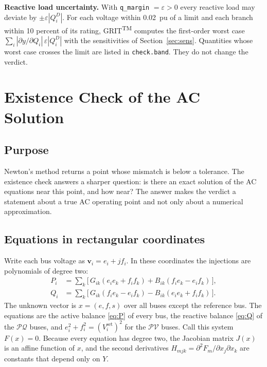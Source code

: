\documentclass[a4paper,11pt]{article}
\newcommand{\TM}{\textsuperscript{TM}}
\newcommand{\GRIT}{GRIT\TM}
\newcommand{\opt}[1]{\texttt{#1}}
\begin{document}
\textbf{Reactive load uncertainty.} With \opt{q\_margin} $=\varepsilon>0$ every reactive load may deviate by $\pm\varepsilon|Q^D_i|$. For each voltage within 0.02~pu of a limit and each branch within 10 percent of its rating, \GRIT{} computes the first-order worst case $\sum_i |\partial y/\partial Q_i|\,\varepsilon|Q^D_i|$ with the sensitivities of Section~\ref{sec:sens}. Quantities whose worst case crosses the limit are listed in \texttt{check.band}. They do not change the verdict.

\section{Existence Check of the AC Solution}\label{sec:cert}

\subsection{Purpose}

Newton's method returns a point whose mismatch is below a tolerance. The existence check answers a sharper question: is there an exact solution of the AC equations near this point, and how near? The answer makes the verdict a statement about a true AC operating point and not only about a numerical approximation.

\subsection{Equations in rectangular coordinates}

Write each bus voltage as $\mathbf{v}_i = e_i + j f_i$. In these coordinates the injections are polynomials of degree two:
\begin{align*}
P_i &= \sum_k \big[\, G_{ik}(e_i e_k + f_i f_k) + B_{ik}(f_i e_k - e_i f_k) \,\big], \\
Q_i &= \sum_k \big[\, G_{ik}(f_i e_k - e_i f_k) - B_{ik}(e_i e_k + f_i f_k) \,\big].
\end{align*}
The unknown vector is $x=(e,f,s)$ over all buses except the reference bus. The equations are the active balance \eqref{eq:P} of every bus, the reactive balance \eqref{eq:Q} of the $\mathcal{PQ}$ buses, and $e_i^2+f_i^2=(V^{\mathrm{set}}_i)^2$ for the $\mathcal{PV}$ buses. Call this system $F(x)=0$. Because every equation has degree two, the Jacobian matrix $J(x)$ is an affine function of $x$, and the second derivatives $H_{mjk}=\partial^2 F_m/\partial x_j\partial x_k$ are constants that depend only on $Y$.
\end{document}
